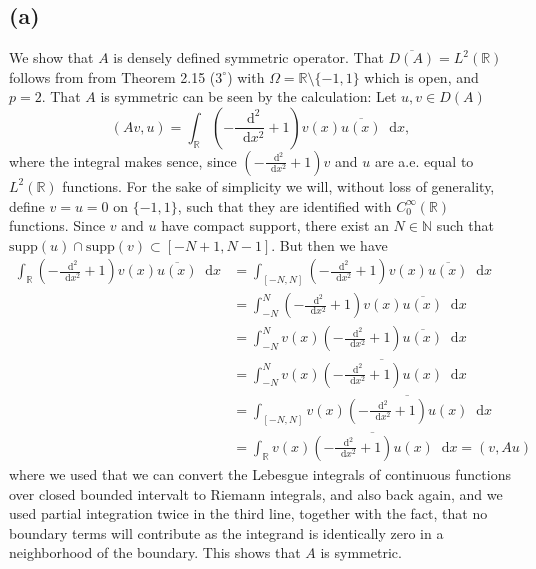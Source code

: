 \documentclass[a4paper,11pt]{article}
\newcommand{\supp}{\text{supp}}
\newcommand*\diff{\mathop{}\!\mathrm{d}}
\newcommand{\R}{\mathbb{R}}
\newcommand{\N}{\mathbb{N}}
\numberwithin{equation}{section}
\begin{document}
\subsection*{(a)} 
We show that $ A $ is densely defined symmetric operator.
That $ \overline{D(A)}=L^2(\R) $ follows from from Theorem 2.15 ($ 3^\circ $) with $ \Omega=\R\setminus\{-1,1\} $ which is open, and $ p=2 $. That $ A $ is symmetric can be seen by the calculation: Let $ u,v\in D(A) $\begin{equation}
(Av,u)=\int_{\R} \left(-\frac{\diff^2}{\diff x^2}+1\right)v(x)\overline{u(x)} \diff x,
\end{equation}
where the integral makes sence, since $ \left(-\frac{\diff^2}{\diff x^2}+1\right)v $ and $ u $ are a.e. equal to $ L^2(\R) $ functions. For the sake of simplicity we will, without loss of generality, define $ v=u=0 $ on $ \{-1,1\} $, such that they are identified with $ C^\infty_0(\R) $ functions. Since $ v $ and $ u $ have compact support, there exist an $ N\in \N $ such that $ \supp(u)\cap \supp(v)\subset [-N+1,N-1] $. But then we have \begin{equation}
\begin{aligned}
\int_{\R} \left(-\frac{\diff^2}{\diff x^2}+1\right)v(x)\overline{u(x)} \diff x&=\int_{[-N,N]} \left(-\frac{\diff^2}{\diff x^2}+1\right)v(x)\overline{u(x)}\diff x\\
&=\int_{-N}^{N}\left(-\frac{\diff^2}{\diff x^2}+1\right)v(x)\overline{u(x)} \diff x\\
&=\int_{-N}^{N}v(x)\left(-\frac{\diff^2}{\diff x^2}+1\right)\overline{u(x)} \diff x\\
&=\int_{-N}^{N}v(x)\overline{\left(-\frac{\diff^2}{\diff x^2}+1\right)u(x)} \diff x\\
&=\int_{[-N,N]}v(x)\overline{\left(-\frac{\diff^2}{\diff x^2}+1\right)u(x)} \diff x\\
&=\int_{\R}v(x)\overline{\left(-\frac{\diff^2}{\diff x^2}+1\right)u(x)} \diff x=(v,Au)
\end{aligned}
\end{equation}
where we used that we can convert the Lebesgue integrals of continuous functions over closed bounded intervalt to Riemann integrals, and also back again, and we used partial integration twice in the third line, together with the fact, that no boundary terms will contribute as the integrand is identically zero in a neighborhood of the boundary. This shows that $ A $ is symmetric.
\end{document}
